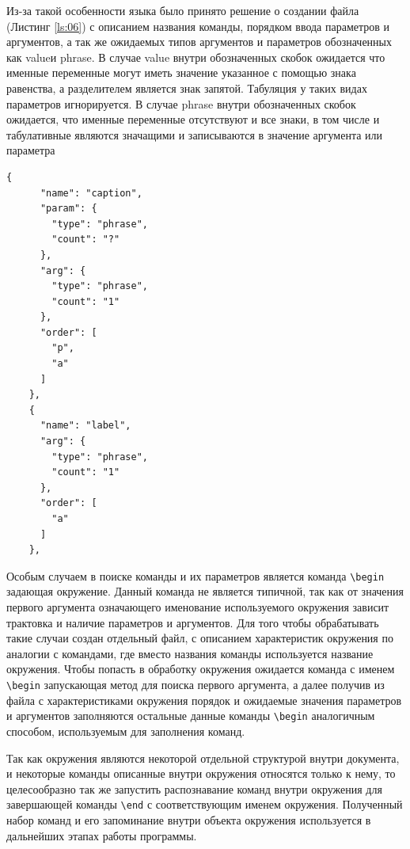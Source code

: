  Из-за такой особенности языка было принято решение о создании файла (Листинг \ref{ls:06}) с описанием названия команды, порядком ввода параметров и аргументов, а так же ожидаемых типов аргументов и параметров обозначенных как \guillemotleft value\guillemotright и \guillemotleft phrase\guillemotright. В случае value внутри обозначенных скобок ожидается что именные переменные могут иметь значение указанное с помощью знака равенства, а разделителем является знак запятой. Табуляция у таких видах параметров игнорируется. 
В случае phrase внутри обозначенных скобок ожидается, что именные переменные отсутствуют и все знаки, в том числе и табулативные являются значащими и записываются в значение аргумента или параметра

\begin{lstlisting}[caption={Пример файла с характеристиками команд}, label={ls:06}]
    {
      "name": "caption",
      "param": {
        "type": "phrase",
        "count": "?"
      },
      "arg": {
        "type": "phrase",
        "count": "1"
      },
      "order": [
        "p",
        "a"
      ]
    },
    {
      "name": "label",
      "arg": {
        "type": "phrase",
        "count": "1"
      },
      "order": [
        "a"
      ]
    },
\end{lstlisting}

Особым случаем в поиске команды и их параметров является команда \verb|\begin| задающая окружение. Данный команда не является типичной, так как от значения первого аргумента означающего именование используемого окружения зависит трактовка и наличие параметров и аргументов. Для того чтобы обрабатывать такие случаи создан отдельный файл, с описанием характеристик окружения по аналогии с командами, где вместо названия команды используется название окружения. Чтобы попасть в обработку окружения ожидается команда с именем \verb|\begin| запускающая метод для поиска первого аргумента, а далее получив из файла с характеристиками окружения порядок и ожидаемые значения параметров и аргументов заполняются остальные данные команды \verb|\begin| аналогичным способом, используемым для заполнения команд. 

Так как окружения являются некоторой отдельной структурой внутри документа, и некоторые команды описанные внутри окружения относятся только к нему, то целесообразно так же запустить распознавание команд внутри окружения для завершающей команды \verb|\end| с соответствующим именем окружения. Полученный набор команд и его запоминание внутри объекта окружения используется в дальнейших этапах работы программы.

